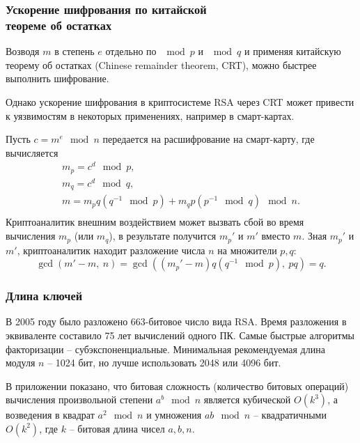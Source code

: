 

\subsubsection[Ускорение шифрования]{Ускорение шифрования по китайской \protect\\ теореме об остатках}

Возводя $m$ в степень $e$ отдельно по $\mod p$ и $\mod q$ и применяя китайскую теорему об остатках (Chinese remainder theorem, CRT), можно быстрее выполнить шифрование.

Однако ускорение шифрования в криптосистеме RSA через CRT может привести к уязвимостям в некоторых применениях, например в смарт-картах.

\example
Пусть $c = m^e \mod n$ передается на расшифрование на смарт-карту, где вычисляется
\[ \begin{array}{c}
    m_p = c^d \mod p, \\
    m_q = c^d \mod q, \\
    m = m_p q (q^{-1} \mod p) + m_q p (p^{-1} \mod q) \mod n. \\
\end{array} \]
Криптоаналитик внешним воздействием может вызвать сбой во время вычисления $m_p$ (или $m_q$), в результате получится $m_p'$ и $m'$ вместо $m$. Зная $m_p'$ и $m'$, криптоаналитик находит разложение числа $n$ на множители $p,q$:
    \[ \gcd(m' - m, ~ n) = \gcd( (m_p' - m) q (q^{-1} \mod p), ~ pq) = q. \]
\exampleend


\subsubsection{Длина ключей}

В 2005 году было разложено 663-битовое число вида RSA. Время разложения в эквиваленте составило 75 лет вычислений одного ПК. Самые быстрые алгоритмы факторизации -- субэкспоненциальные. Минимальная рекомендуемая длина модуля $n$ -- 1024 бит, но лучше использовать 2048 или 4096 бит.

В приложении показано, что битовая сложность (количество битовых операций) вычисления произвольной степени $a^b \mod n$ является кубической $O(k^3)$, а возведения в квадрат $a^2 \mod n$ и умножения $a b \mod n$ -- квадратичными $O(k^2)$, где $k$ -- битовая длина чисел $a,b,n$.

